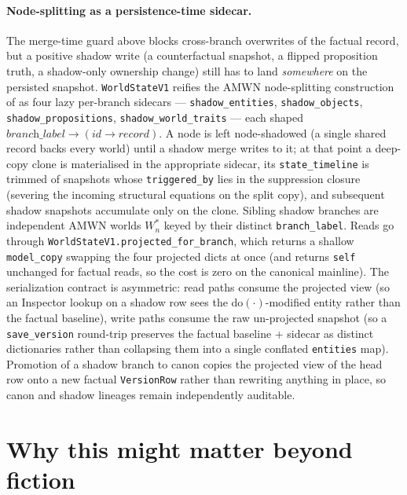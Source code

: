 \documentclass[11pt]{article}
\begin{document}
\paragraph{Node-splitting as a persistence-time sidecar.}
The merge-time guard above blocks cross-branch overwrites of the
factual record, but a positive shadow write
(a counterfactual snapshot, a flipped proposition truth, a
shadow-only ownership change) still has to land \emph{somewhere}
on the persisted snapshot. \texttt{WorldStateV1} reifies the
AMWN node-splitting construction of \citet{correa2025amwn} as
four lazy per-branch sidecars
--- \texttt{shadow\_entities}, \texttt{shadow\_objects},
\texttt{shadow\_propositions}, \texttt{shadow\_world\_traits} ---
each shaped
$\textit{branch\_label} \to (\textit{id} \to \textit{record})$.
A node is left node-shadowed (a single shared record backs every
world) until a shadow merge writes to it; at that point a
deep-copy clone is materialised in the appropriate sidecar, its
\texttt{state\_timeline} is trimmed of snapshots whose
\texttt{triggered\_by} lies in the suppression closure
(severing the incoming structural equations on the split copy),
and subsequent shadow snapshots accumulate only on the clone.
Sibling shadow branches are independent AMWN worlds $W^*_n$
keyed by their distinct \texttt{branch\_label}. Reads go through
\texttt{WorldStateV1.projected\_for\_branch}, which returns a
shallow \texttt{model\_copy} swapping the four projected dicts
at once (and returns \texttt{self} unchanged for factual reads,
so the cost is zero on the canonical mainline). The serialization
contract is asymmetric: read paths consume the projected view
(so an Inspector lookup on a shadow row sees the
do$(\cdot)$-modified entity rather than the factual baseline),
write paths consume the raw un-projected snapshot (so a
\texttt{save\_version} round-trip preserves the factual baseline
+ sidecar as distinct dictionaries rather than collapsing them
into a single conflated \texttt{entities} map). Promotion of a
shadow branch to canon copies the projected view of the head row
onto a new factual \texttt{VersionRow} rather than rewriting
anything in place, so canon and shadow lineages remain
independently auditable.


\section{Why this might matter beyond fiction}
\label{sec:relevance}
\end{document}
